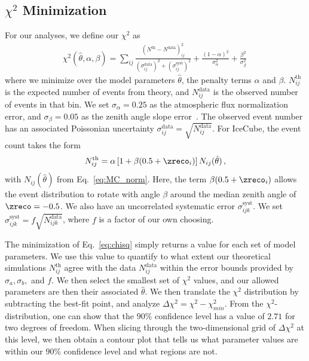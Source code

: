 \subsection{\texorpdfstring{$\chi^2$}{Chi-squared} Minimization}
For our analyses, we define our $\chi^2$ as
\begin{align} \label{eq:chisq}
    \chi^{2}(\hat{\theta},\alpha,\beta)=\sum_{ij} \frac{\left(N^\text{th}-N^\text{data}\right)_{ij}^{2}}
    {\left(\sigma^\text{data}_{ij}\right)^{2} + \left(\sigma^\text{syst}_{ij}\right)^{2}}+ 
    \frac{(1-\alpha)^2}{\sigma_\alpha^2} + \frac{\beta^2}{\sigma_\beta^2}\,
\end{align}
where we minimize over the model parameters $\hat{\theta}$, the penalty terms $\alpha$ and $\beta$.
$N_{ij}^\text{th}$ is the expected number of events from theory, and $N_{ij}^\text{data}$ is the observed number of events in that bin. 
We set $\sigma_\alpha = 0.25$ as the atmospheric flux normalization error, and $\sigma_\beta = 0.05$ as the zenith angle slope error~\cite{hondapaper}. 
The observed event number has an associated Poissonian uncertainty $\sigma_{ij}^\text{data} = \sqrt{N_{ij}^\text{data}}$.
For IceCube, the event count takes the form
\begin{align}
    N^\text{th}_{ij} = \alpha\left[1+\beta (0.5 + \zreco_i )\right] N_{ij}(\hat{\theta})\,,
\end{align}
with $N_{ij}(\hat{\theta})$ from Eq.~\ref{eq:MC_norm}. Here, the term $ \beta (0.5 + \zreco_i )$ allows the event distribution to rotate with angle $\beta$ around the median zenith angle of $\zreco = -0.5$.
We also have an uncorrelated systematic error $\sigma_{ijk}^\text{syst}$. We set $\sigma_{ijk}^\text{syst} = f\sqrt{N_{ijk}^\text{data}}$, where $f$ is a factor of our own choosing.

The minimization of Eq.~\ref{eq:chisq} simply returns a value for each set of model parameters. We use this value to quantify to what extent
our theoretical simulations $N^\text{th}_{ij}$ agree with the data $N^\text{data}_{ij}$ within the error bounds provided by $\sigma_a,\sigma_b,$ and $f$.
We then select the smallest set of $\chi^2$ values, and our allowed parameters are then their associated $\hat{\theta}$.
We then translate the $\chi^2$ distribution by subtracting the best-fit point, and analyze $\Delta \chi^2 = \chi^2 - \chi^2_{min}$.
From the $\chi^2$-distribution, one can show that the $90\%$ confidence level has a value of $2.71$ for two degrees of freedom. When slicing through the 
two-dimensional grid of $\Delta \chi^2$ at this level, we then obtain a contour plot that tells us what parameter values are within our $90 \%$ confidence level and what regions are not.

